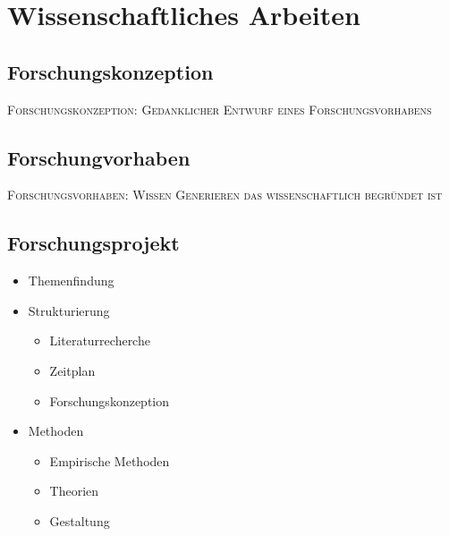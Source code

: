 \chapter{Wissenschaftliches Arbeiten}\label{sec:parm}

\section{Forschungskonzeption}\label{sec:parm}

{\textsc{
Forschungskonzeption: Gedanklicher Entwurf eines Forschungsvorhabens\\
}}

\section{Forschungvorhaben}\label{sec:parm}

{\textsc{
Forschungsvorhaben: Wissen Generieren das wissenschaftlich begründet ist\\
}}

\section{Forschungsprojekt}\label{sec:parm}

\begin{itemize}
\item Themenfindung

\end{itemize}


\begin{itemize}
\item Strukturierung
\begin{itemize}
\item Literaturrecherche
\item Zeitplan
\item Forschungskonzeption
\end{itemize}

\end{itemize}

\begin{itemize}
\item Methoden
\begin{itemize}
\item Empirische Methoden
\item Theorien
\item Gestaltung
\end{itemize}
\end{itemize}

